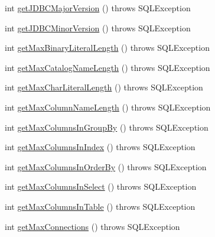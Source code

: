 \begin{DoxyCompactItemize}
\item 
int \mbox{\hyperlink{classcom_1_1mysql_1_1cj_1_1jdbc_1_1_database_meta_data_acf7ab48f588b46a8b2c8ea7c4dee7aa1}{get\+J\+D\+B\+C\+Major\+Version}} ()  throws S\+Q\+L\+Exception 
\item 
int \mbox{\hyperlink{classcom_1_1mysql_1_1cj_1_1jdbc_1_1_database_meta_data_a42f15334f22a2e648401fb89c11b61cc}{get\+J\+D\+B\+C\+Minor\+Version}} ()  throws S\+Q\+L\+Exception 
\item 
int \mbox{\hyperlink{classcom_1_1mysql_1_1cj_1_1jdbc_1_1_database_meta_data_a0743906977e013ec4b83af02330db2e4}{get\+Max\+Binary\+Literal\+Length}} ()  throws S\+Q\+L\+Exception 
\item 
int \mbox{\hyperlink{classcom_1_1mysql_1_1cj_1_1jdbc_1_1_database_meta_data_a0bbcea8aa06a9b1953a31c5e82806bb4}{get\+Max\+Catalog\+Name\+Length}} ()  throws S\+Q\+L\+Exception 
\item 
int \mbox{\hyperlink{classcom_1_1mysql_1_1cj_1_1jdbc_1_1_database_meta_data_a8b9912f9db39e22957f00881a17d69fe}{get\+Max\+Char\+Literal\+Length}} ()  throws S\+Q\+L\+Exception 
\item 
int \mbox{\hyperlink{classcom_1_1mysql_1_1cj_1_1jdbc_1_1_database_meta_data_a723662c0e2facd127edb178a26972daf}{get\+Max\+Column\+Name\+Length}} ()  throws S\+Q\+L\+Exception 
\item 
int \mbox{\hyperlink{classcom_1_1mysql_1_1cj_1_1jdbc_1_1_database_meta_data_ae18e4f3a48a9a4d1582f1fa25cb38527}{get\+Max\+Columns\+In\+Group\+By}} ()  throws S\+Q\+L\+Exception 
\item 
int \mbox{\hyperlink{classcom_1_1mysql_1_1cj_1_1jdbc_1_1_database_meta_data_a2876875ffdff9b0958a67a9df4e6c3d4}{get\+Max\+Columns\+In\+Index}} ()  throws S\+Q\+L\+Exception 
\item 
int \mbox{\hyperlink{classcom_1_1mysql_1_1cj_1_1jdbc_1_1_database_meta_data_a36493a3ec90362550c8073060f09975e}{get\+Max\+Columns\+In\+Order\+By}} ()  throws S\+Q\+L\+Exception 
\item 
int \mbox{\hyperlink{classcom_1_1mysql_1_1cj_1_1jdbc_1_1_database_meta_data_ab59408daad0419ca46b30d530d1698f1}{get\+Max\+Columns\+In\+Select}} ()  throws S\+Q\+L\+Exception 
\item 
int \mbox{\hyperlink{classcom_1_1mysql_1_1cj_1_1jdbc_1_1_database_meta_data_ac8a4df2879a73abc6b4f67597e4e1889}{get\+Max\+Columns\+In\+Table}} ()  throws S\+Q\+L\+Exception 
\item 
int \mbox{\hyperlink{classcom_1_1mysql_1_1cj_1_1jdbc_1_1_database_meta_data_a32625ff8d735d95f5504d6a6a0650b3a}{get\+Max\+Connections}} ()  throws S\+Q\+L\+Exception 

\end{DoxyCompactItemize}

